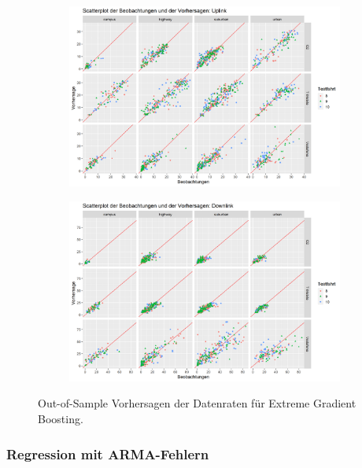 \begin{figure}
\centering
\begin{subfigure}{\textwidth}
    \centering
    \includegraphics[width=\textwidth]{abbildungen/xgboost_predictions_ul}
\end{subfigure}
\begin{subfigure}{\textwidth}
    \centering
    \includegraphics[width=\textwidth]{abbildungen/xgboost_predictions_dl}
\end{subfigure}
\caption{Out-of-Sample Vorhersagen der Datenraten f\"ur Extreme Gradient Boosting.}
\label{fig:datarate-predictions-xgboost}
\end{figure}

\subsubsection{Regression mit ARMA-Fehlern}


